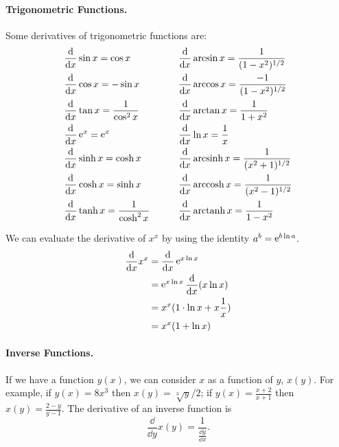 \paragraph{Trigonometric Functions.}
Some derivatives of trigonometric functions are:
\begin{alignat*}{2}
  &\frac{\mathrm{d}}{\mathrm{d} x} \sin x = \cos x &\qquad 
  &\frac{\mathrm{d}}{\mathrm{d} x} \arcsin x = \frac{1}{(1-x^2)^{1/2}} 
  \\
  &\frac{\mathrm{d}}{\mathrm{d} x} \cos x = - \sin x &\qquad
  &\frac{\mathrm{d}}{\mathrm{d} x} \arccos x = \frac{-1}{(1-x^2)^{1/2}}
  \\
  &\frac{\mathrm{d}}{\mathrm{d} x} \tan x = \frac{1}{\cos^2 x} &\qquad
  &\frac{\mathrm{d}}{\mathrm{d} x} \arctan x = \frac{1}{1+x^2} 
  \\
  &\frac{\mathrm{d}}{\mathrm{d} x} \mathop{\mathrm{e}}\nolimits^x = \mathop{\mathrm{e}}\nolimits^x &\qquad 
  &\frac{\mathrm{d}}{\mathrm{d} x} \ln x = \frac{1}{x} 
  \\
  &\frac{\mathrm{d}}{\mathrm{d} x} \sinh x = \cosh x &\qquad
  &\frac{\mathrm{d}}{\mathrm{d} x} \mathop{\mathrm{arcsinh}}\nolimits x = \frac{1}{(x^2+1)^{1/2}} 
  \\
  &\frac{\mathrm{d}}{\mathrm{d} x} \cosh x = \sinh x &\qquad
  &\frac{\mathrm{d}}{\mathrm{d} x} \mathop{\mathrm{arccosh}}\nolimits x = \frac{1}{(x^2-1)^{1/2}} 
  \\
  &\frac{\mathrm{d}}{\mathrm{d} x} \tanh x = \frac{1}{\cosh^2 x} &\qquad
  &\frac{\mathrm{d}}{\mathrm{d} x} \mathop{\mathrm{arctanh}}\nolimits x = \frac{1}{1-x^2} 
\end{alignat*}





\begin{Example}
  We can evaluate the derivative of $x^x$ by using the identity
  $a^b = \mathop{\mathrm{e}}\nolimits^{b \ln a}$.
  \begin{align*}
    \frac{\mathrm{d}}{\mathrm{d} x} x^x
    &= \frac{\mathrm{d}}{\mathrm{d} x} \mathop{\mathrm{e}}\nolimits^{x \ln x} 
    \\
    &= \mathop{\mathrm{e}}\nolimits^{x \ln x} \frac{\mathrm{d}}{\mathrm{d} x} (x \ln x) 
    \\
    &= x^x (1 \cdot \ln x + x \frac{1}{x} ) 
    \\
    &= x^x (1 + \ln x)
  \end{align*}
\end{Example}




\paragraph{Inverse Functions.}
If we have a function $y(x)$, we can consider $x$ as a function of $y$, $x(y)$.
For example, if $y(x) = 8 x^3$ then $x(y) = \sqrt[3]{y} / 2$; if 
$y(x) = \frac{x+2}{x+1}$ then $x(y) = \frac{2-y}{y-1}$.  The derivative
of an inverse function is
\[
\frac{\dd}{\dd y} x(y) = \frac{1}{\frac{\dd y}{\dd x}}.
\]


